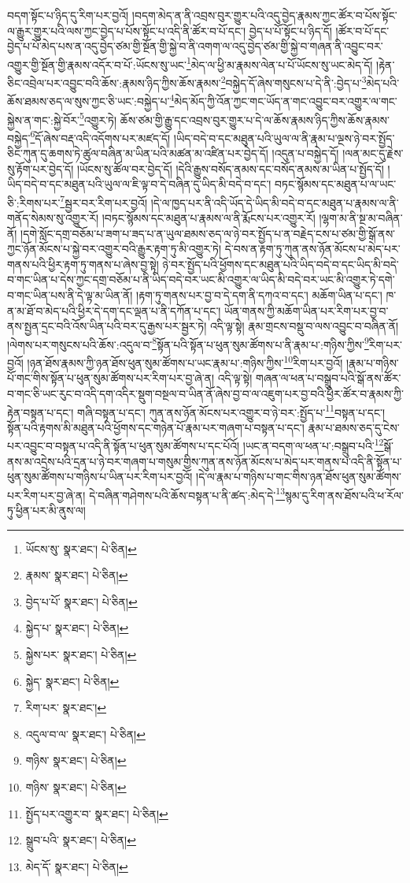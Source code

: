 བདག་སྟོང་པ་ཉིད་དུ་རིག་པར་བྱའོ། །བདག་མེད་ན་ནི་འབྲས་བུར་གྱུར་པའི་འདུ་བྱེད་རྣམས་ཀྱང་ཚོར་བ་པོས་སྟོང་ལ་རྒྱུར་གྱུར་པའི་ལས་ཀྱང་བྱེད་པ་པོས་སྟོང་པ་འདི་ནི་ཚོར་བ་པོ་དང་། བྱེད་པ་པོ་སྟོང་པ་ཉིད་དོ། །ཚོར་བ་པོ་དང་བྱེད་པ་པོ་མེད་པས་ན་འདུ་བྱེད་ཙམ་གྱི་སྔོན་གྱི་སྐྱེ་བ་ནི་འགག་ལ་འདུ་བྱེད་ཙམ་གྱི་སྐྱེ་བ་གཞན་ནི་འབྱུང་བར་འགྱུར་གྱི་སྔོན་གྱི་རྣམས་འདོར་བ་པོ་:ཡོངས་སུ་ཡང་\footnote{ཡོངས་སུ་  སྣར་ཐང་།  པེ་ཅིན། }མེད་ལ་ཕྱི་མ་རྣམས་ལེན་པ་པོ་ཡོངས་སུ་ཡང་མེད་དོ། །རྟེན་ཅིང་འབྲེལ་པར་འབྱུང་བའི་ཆོས་:རྣམས་ཉིད་ཀྱིས་ཆོས་རྣམས་\footnote{རྣམས་  སྣར་ཐང་།  པེ་ཅིན། }བསྐྱེད་དོ་ཞེས་གསུངས་པ་དེ་ནི་:བྱེད་པ་\footnote{བྱེད་པ་པོ་  སྣར་ཐང་།  པེ་ཅིན། }མེད་པའི་ཆོས་ཐམས་ཅད་ལ་སུས་ཀྱང་ཅི་ཡང་:བསྐྱེད་པ་\footnote{སྐྱེད་པ་  སྣར་ཐང་།  པེ་ཅིན། }མེད་མོད་ཀྱི་འོན་ཀྱང་གང་ཡོད་ན་གང་འབྱུང་བར་འགྱུར་ལ་གང་སྐྱེས་ན་གང་:སྐྱེ་བོར་\footnote{སྐྱེས་པར་  སྣར་ཐང་།  པེ་ཅིན། }འགྱུར་ཏེ། ཆོས་ཙམ་གྱི་རྒྱུ་དང་འབྲས་བུར་གྱུར་པ་དེ་ལ་ཆོས་རྣམས་ཉིད་ཀྱིས་ཆོས་རྣམས་བསྐྱེད་\footnote{སྐྱེད་  སྣར་ཐང་།  པེ་ཅིན། }དོ་ཞེས་བརྡ་འདི་འདོགས་པར་མཛད་དོ། །ཡིད་བདེ་བ་དང་མཐུན་པའི་ཡུལ་ལ་ནི་རྣམ་པ་ལྔས་ཉེ་བར་སྤྱོད་ཅིང་ཀུན་དུ་ཆགས་ཏེ་ཚུལ་བཞིན་མ་ཡིན་པའི་མཚན་མ་འཛིན་པར་བྱེད་དོ། །འདུན་པ་བསྐྱེད་དོ། །ལན་མང་དུ་རྗེས་སུ་རྟོག་པར་བྱེད་དོ། །ཡོངས་སུ་ཚོལ་བར་བྱེད་དོ། །དེའི་རྒྱུས་བསོད་ནམས་དང་བསོད་ནམས་མ་ཡིན་པ་སྤྱོད་དོ། །ཡིད་བདེ་བ་དང་མཐུན་པའི་ཡུལ་ལ་ཇི་ལྟ་བ་དེ་བཞིན་དུ་ཡིད་མི་བདེ་བ་དང་། བཏང་སྙོམས་དང་མཐུན་པ་ལ་ཡང་ཅི་:རིགས་པར་\footnote{རིག་པར་  སྣར་ཐང་། }སྦྱར་བར་རིག་པར་བྱའོ། །དེ་ལ་ཁྱད་པར་ནི་འདི་ཡོད་དེ་ཡིད་མི་བདེ་བ་དང་མཐུན་པ་རྣམས་ལ་ནི་གནོད་སེམས་སུ་འགྱུར་རོ། །བཏང་སྙོམས་དང་མཐུན་པ་རྣམས་ལ་ནི་རྨོངས་པར་འགྱུར་རོ། །ལྷག་མ་ནི་སྔ་མ་བཞིན་ནོ། །དགེ་སློང་དགྲ་བཅོམ་པ་ཟག་པ་ཟད་པ་ན་ཡུལ་ཐམས་ཅད་ལ་ཉེ་བར་སྤྱོད་པ་ན་བརྗེད་ངས་པ་ཙམ་གྱི་སྒོ་ནས་ཀྱང་ཉོན་མོངས་པ་སྐྱེ་བར་འགྱུར་བའི་རྒྱུར་རྟག་ཏུ་མི་འགྱུར་ཏེ། དེ་བས་ན་རྟག་ཏུ་ཀུན་ནས་ཉོན་མོངས་པ་མེད་པར་གནས་པའི་ཕྱིར་རྟག་ཏུ་གནས་པ་ཞེས་བྱ་སྟེ། ཉེ་བར་སྤྱོད་པའི་ཕྱོགས་དང་མཐུན་པའི་ཡིད་བདེ་བ་དང་ཡིད་མི་བདེ་བ་གང་ཡིན་པ་དེས་ཀྱང་དགྲ་བཅོམ་པ་ནི་ཡིད་བདེ་བར་ཡང་མི་འགྱུར་ལ་ཡིད་མི་བདེ་བར་ཡང་མི་འགྱུར་ཏེ་དགེ་བ་གང་ཡིན་པས་ནི་དེ་ལྟ་མ་ཡིན་ནོ། །རྟག་ཏུ་གནས་པར་བྱ་བ་དེ་དག་ནི་དཀའ་བ་དང་། མཆོག་ཡིན་པ་དང་། ཁ་ན་མ་ཐོ་བ་མེད་པའི་ཕྱིར་དེ་དག་དང་ལྡན་པ་ནི་དཀོན་པ་དང་། ཡོན་གནས་ཀྱི་མཆོག་ཡིན་པར་རིག་པར་བྱ་བ་ནས་སྤྱན་དྲང་བའི་འོས་ཡིན་པའི་བར་དུ་རྒྱས་པར་སྦྱར་ཏེ། འདི་ལྟ་སྟེ། རྣམ་གྲངས་བསྡུ་བ་ལས་འབྱུང་བ་བཞིན་ནོ། །ལེགས་པར་གསུངས་པའི་ཆོས་:འདུལ་བ་\footnote{འདུལ་བ་ལ་  སྣར་ཐང་།  པེ་ཅིན། }སྟོན་པའི་སྟོན་པ་ཕུན་སུམ་ཚོགས་པ་ནི་རྣམ་པ་:གཉིས་ཀྱིས་\footnote{གཉིས་  སྣར་ཐང་།  པེ་ཅིན། }རིག་པར་བྱའོ། །ཉན་ཐོས་རྣམས་ཀྱི་ཉན་ཐོས་ཕུན་སུམ་ཚོགས་པ་ཡང་རྣམ་པ་:གཉིས་ཀྱིས་\footnote{གཉིས་  སྣར་ཐང་།  པེ་ཅིན། }རིག་པར་བྱའོ། །རྣམ་པ་གཉིས་པོ་གང་གིས་སྟོན་པ་ཕུན་སུམ་ཚོགས་པར་རིག་པར་བྱ་ཞེ་ན། འདི་ལྟ་སྟེ། གཞན་ལ་ཕན་པ་བསྒྲུབ་པའི་སྒོ་ནས་ཚོར་བ་གང་ཅི་ཡང་རུང་བ་འདི་དག་འདིར་སྡུག་བསྔལ་བ་ཡིན་ནོ་ཞེས་བྱ་བ་ལ་འཇུག་པར་བྱ་བའི་ཕྱིར་ཚོར་བ་རྣམས་ཀྱི་རྟེན་བསྟན་པ་དང་། གཞི་བསྟན་པ་དང་། ཀུན་ནས་ཉོན་མོངས་པར་འགྱུར་བ་ཉེ་བར་:སྤྱོད་པ་\footnote{སྤྱོད་པར་འགྱུར་བ་  སྣར་ཐང་།  པེ་ཅིན། }བསྟན་པ་དང་། སྟོན་པའི་རྟགས་མི་མཐུན་པའི་ཕྱོགས་དང་གཉེན་པོ་རྣམ་པར་གཞག་པ་བསྟན་པ་དང་། རྣམ་པ་ཐམས་ཅད་དུ་ངེས་པར་འབྱུང་བ་བསྟན་པ་འདི་ནི་སྟོན་པ་ཕུན་སུམ་ཚོགས་པ་དང་པོའོ། །ཡང་ན་བདག་ལ་ཕན་པ་:བསྒྲུབ་པའི་\footnote{སྒྲུབ་པའི་  སྣར་ཐང་།  པེ་ཅིན། }སྒོ་ནས་མ་འདྲེས་པའི་དྲན་པ་ཉེ་བར་གཞག་པ་གསུམ་གྱིས་ཀུན་ནས་ཉོན་མོངས་པ་མེད་པར་གནས་པ་འདི་ནི་སྟོན་པ་ཕུན་སུམ་ཚོགས་པ་གཉིས་པ་ཡིན་པར་རིག་པར་བྱའོ། །དེ་ལ་རྣམ་པ་གཉིས་པ་གང་གིས་ཉན་ཐོས་ཕུན་སུམ་ཚོགས་པར་རིག་པར་བྱ་ཞེ་ན། དེ་བཞིན་གཤེགས་པའི་ཆོས་བསྟན་པ་ནི་ཚད་:མེད་དེ་\footnote{མེད་དོ་  སྣར་ཐང་།  པེ་ཅིན། }སྙམ་དུ་རིག་ནས་ཐོས་པའི་ཕ་རོལ་ཏུ་ཕྱིན་པར་མི་ནུས་ལ། 